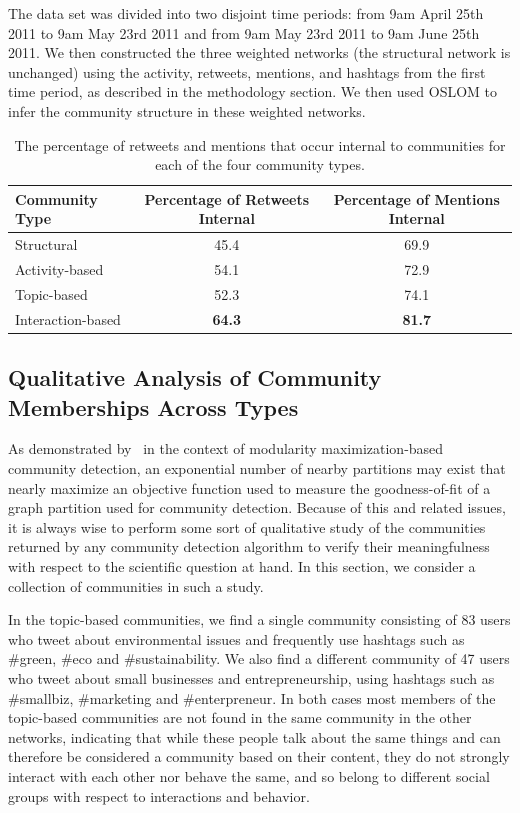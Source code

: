 

The data set was divided into two disjoint time periods: from 9am April 25th 2011 to 9am May 23rd 2011 and from 9am May 23rd 2011 to 9am June 25th 2011. We then constructed the three weighted networks (the structural network is unchanged) using the activity, retweets, mentions, and hashtags from the first time period, as described in the methodology section. We then used OSLOM to infer the community structure in these weighted networks. 

\begin{table}
	\caption{The percentage of retweets and mentions that occur internal to communities for each of the four community types.}
	\centering
	\begin{tabular}{l | c c}
		Community Type & Percentage of Retweets Internal & Percentage of Mentions Internal \\
		\hline
		Structural & 45.4 & 69.9 \\
		Activity-based & 54.1 & 72.9 \\
		Topic-based & 52.3 & 74.1  \\
		Interaction-based & \textbf{64.3} & \textbf{81.7}
	\end{tabular}
\end{table}

\subsection{Qualitative Analysis of Community Memberships Across Types}

As demonstrated by~\cite{good2010performance} in the context of modularity maximization-based community detection, an exponential number of nearby partitions may exist that nearly maximize an objective function used to measure the goodness-of-fit of a graph partition used for community detection. Because of this and related issues, it is always wise to perform some sort of qualitative study of the communities returned by any  community detection algorithm to verify their meaningfulness with respect to the scientific question at hand. In this section, we consider a collection of communities in such a study. 

In the topic-based communities, we find a single community consisting of 83 users who tweet about environmental issues and frequently use hashtags such as \#green, \#eco and \#sustainability. We also find a different community of 47 users who tweet about small businesses and entrepreneurship, using hashtags such as \#smallbiz, \#marketing and \#enterpreneur. In both cases most members of the topic-based communities are not found in the same community in the other networks, indicating that while these people talk about the same things and can therefore be considered a community based on their content, they do not strongly interact with each other nor behave the same, and so belong to different social groups with respect to interactions and behavior.

